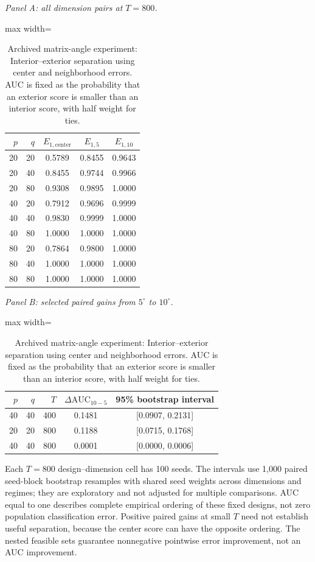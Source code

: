 \documentclass[12pt,letterpaper]{article}
\def\spacingset#1{\renewcommand{\baselinestretch}{#1}\small\normalsize}
\theoremstyle{plain}
\theoremstyle{definition}
\begin{document}
\begin{table}[p]
\begingroup
\spacingset{1.08}
\centering
\caption{Archived matrix-angle experiment: Interior--exterior separation using center and neighborhood errors. AUC is fixed as the probability that an exterior score is smaller than an interior score, with half weight for ties.}
\label{s23:tab:cap_auc}
\small
\setlength{\tabcolsep}{6pt}
\renewcommand{\arraystretch}{1.10}
\textit{Panel A: all dimension pairs at $T=800$.}\par\smallskip
\begin{adjustbox}{max width=\linewidth}
\begin{tabular}{rrccc}
\toprule
$p$ & $q$ & $E_{1,\mathrm{center}}$ & $E_{1,5}$ & $E_{1,10}$\\
\midrule
20 & 20 & 0.5789 & 0.8455 & 0.9643\\
20 & 40 & 0.8455 & 0.9744 & 0.9966\\
20 & 80 & 0.9308 & 0.9895 & 1.0000\\
40 & 20 & 0.7912 & 0.9696 & 0.9999\\
40 & 40 & 0.9830 & 0.9999 & 1.0000\\
40 & 80 & 1.0000 & 1.0000 & 1.0000\\
80 & 20 & 0.7864 & 0.9800 & 1.0000\\
80 & 40 & 1.0000 & 1.0000 & 1.0000\\
80 & 80 & 1.0000 & 1.0000 & 1.0000\\
\bottomrule
\end{tabular}
\end{adjustbox}
\par\medskip
\textit{Panel B: selected paired gains from $5^\circ$ to $10^\circ$.}\par\smallskip
\begin{adjustbox}{max width=\linewidth}
\begin{tabular}{rrrcc}
\toprule
$p$ & $q$ & $T$ & $\Delta\mathrm{AUC}_{10-5}$ & 95\% bootstrap interval\\
\midrule
40 & 40 & 400 & 0.1481 & [0.0907, 0.2131]\\
20 & 20 & 800 & 0.1188 & [0.0715, 0.1768]\\
40 & 40 & 800 & 0.0001 & [0.0000, 0.0006]\\
\bottomrule
\end{tabular}
\end{adjustbox}
\par\medskip
\begin{minipage}{0.96\linewidth}\footnotesize
Each $T=800$ design--dimension cell has 100 seeds. The intervals use 1,000 paired seed-block bootstrap resamples with shared seed weights across dimensions and regimes; they are exploratory and not adjusted for multiple comparisons. AUC equal to one describes complete empirical ordering of these fixed designs, not zero population classification error. Positive paired gains at small $T$ need not establish useful separation, because the center score can have the opposite ordering. The nested feasible sets guarantee nonnegative pointwise error improvement, not an AUC improvement.
\end{minipage}
\endgroup
\end{table}
\end{document}

